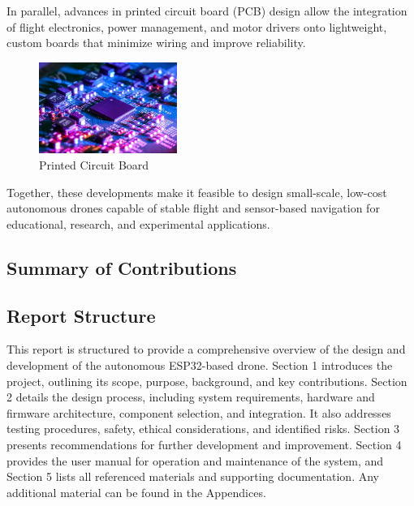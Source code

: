In parallel, advances in printed circuit board (PCB) design allow the integration of flight electronics, power management, and motor drivers onto lightweight, custom boards that minimize wiring and improve reliability. 

\begin{figure}[H]
    \centering
    \captionsetup{justification=centering, margin=1cm}
    \includegraphics[width=0.4\textwidth]{img/intro-pcb.PNG}
    \caption{Printed Circuit Board \cite{mistral2020}}
\end{figure}

Together, these developments make it feasible to design small-scale, low-cost autonomous drones capable of stable flight and sensor-based navigation for educational, research, and experimental applications.

\subsection{Summary of Contributions}

\subsection{Report Structure}
This report is structured to provide a comprehensive overview of the design and development of the autonomous ESP32-based drone. Section 1 introduces the project, outlining its scope, purpose, background, and key contributions. Section 2 details the design process, including system requirements, hardware and firmware architecture, component selection, and integration. It also addresses testing procedures, safety, ethical considerations, and identified risks. Section 3 presents recommendations for further development and improvement. Section 4 provides the user manual for operation and maintenance of the system, and Section 5 lists all referenced materials and supporting documentation. Any additional material can be found in the Appendices.


